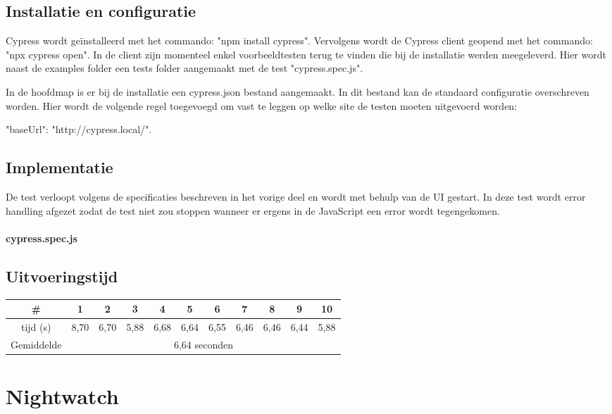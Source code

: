 \subsection{Installatie en configuratie}


Cypress wordt geïnstalleerd met het commando: "npm install cypress". Vervolgens wordt de Cypress client geopend met het commando: "npx cypress open". In de client zijn momenteel enkel voorbeeldtesten terug te vinden die bij de installatie werden meegeleverd. Hier wordt naast de examples folder een tests folder aangemaakt met de test "cypress.spec.js".

In de hoofdmap is er bij de installatie een cypress.json bestand aangemaakt. In dit bestand kan de standaard configuratie overschreven worden. Hier wordt de volgende regel toegevoegd om vast te leggen op welke site de testen moeten uitgevoerd worden: 

"baseUrl": "http://cypress.local/".

\subsection{Implementatie}
De test verloopt volgens de specificaties beschreven in het vorige deel en wordt met behulp van de \gls{UI} gestart. In deze test wordt error handling afgezet zodat de test niet zou stoppen wanneer er ergens in de JavaScript een error wordt tegengekomen.

\clearpage
\paragraph{cypress.spec.js}
\subsection{Uitvoeringstijd}

\begin{tabular}{ |c| |c |c |c |c |c |c |c |c |c |c| }
\hline
	\# & 1 & 2 & 3 & 4 & 5 & 6 & 7 & 8 & 9 & 10\\
\hline
	tijd (s) & 8,70 & 6,70 & 5,88 & 6,68 & 6,64 & 6,55 & 6,46 & 6,46 & 6,44 & 5,88\\
\hline
 Gemiddelde & \multicolumn{10}{c|}{6,64 seconden}\\
\hline
\end{tabular}

\clearpage
\section{Nightwatch}
